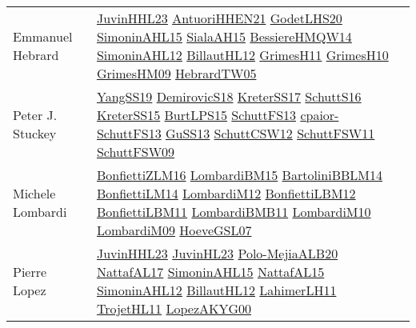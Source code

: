 {\begin{longtable}{p{4cm}p{20cm}}
Emmanuel Hebrard & \href{papers/JuvinHHL23.pdf}{JuvinHHL23}\cite{JuvinHHL23} \href{papers/AntuoriHHEN21.pdf}{AntuoriHHEN21}\cite{AntuoriHHEN21} \href{papers/GodetLHS20.pdf}{GodetLHS20}\cite{GodetLHS20} \href{articles/SimoninAHL15.pdf}{SimoninAHL15}\cite{SimoninAHL15} \href{papers/SialaAH15.pdf}{SialaAH15}\cite{SialaAH15} \href{papers/BessiereHMQW14.pdf}{BessiereHMQW14}\cite{BessiereHMQW14} \href{papers/SimoninAHL12.pdf}{SimoninAHL12}\cite{SimoninAHL12} \href{papers/BillautHL12.pdf}{BillautHL12}\cite{BillautHL12} \href{papers/GrimesH11.pdf}{GrimesH11}\cite{GrimesH11} \href{papers/GrimesH10.pdf}{GrimesH10}\cite{GrimesH10} \href{papers/GrimesHM09.pdf}{GrimesHM09}\cite{GrimesHM09} \href{papers/HebrardTW05.pdf}{HebrardTW05}\cite{HebrardTW05} \\
Peter J. Stuckey & \href{papers/YangSS19.pdf}{YangSS19}\cite{YangSS19} \href{papers/DemirovicS18.pdf}{DemirovicS18}\cite{DemirovicS18} \href{articles/KreterSS17.pdf}{KreterSS17}\cite{KreterSS17} \href{papers/SchuttS16.pdf}{SchuttS16}\cite{SchuttS16} \href{papers/KreterSS15.pdf}{KreterSS15}\cite{KreterSS15} \href{papers/BurtLPS15.pdf}{BurtLPS15}\cite{BurtLPS15} \href{papers/SchuttFS13.pdf}{SchuttFS13}\cite{SchuttFS13} \href{papers/cpaior-SchuttFS13.pdf}{cpaior-SchuttFS13}\cite{cpaior-SchuttFS13} \href{papers/GuSS13.pdf}{GuSS13}\cite{GuSS13} \href{papers/SchuttCSW12.pdf}{SchuttCSW12}\cite{SchuttCSW12} \href{articles/SchuttFSW11.pdf}{SchuttFSW11}\cite{SchuttFSW11} \href{papers/SchuttFSW09.pdf}{SchuttFSW09}\cite{SchuttFSW09} \\
Michele Lombardi & \href{papers/BonfiettiZLM16.pdf}{BonfiettiZLM16}\cite{BonfiettiZLM16} \href{papers/LombardiBM15.pdf}{LombardiBM15}\cite{LombardiBM15} \href{papers/BartoliniBBLM14.pdf}{BartoliniBBLM14}\cite{BartoliniBBLM14} \href{papers/BonfiettiLM14.pdf}{BonfiettiLM14}\cite{BonfiettiLM14} \href{articles/LombardiM12.pdf}{LombardiM12}\cite{LombardiM12} \href{papers/BonfiettiLBM12.pdf}{BonfiettiLBM12}\cite{BonfiettiLBM12} \href{papers/BonfiettiLBM11.pdf}{BonfiettiLBM11}\cite{BonfiettiLBM11} \href{papers/LombardiBMB11.pdf}{LombardiBMB11}\cite{LombardiBMB11} \href{papers/LombardiM10.pdf}{LombardiM10}\cite{LombardiM10} \href{papers/LombardiM09.pdf}{LombardiM09}\cite{LombardiM09} \href{papers/HoeveGSL07.pdf}{HoeveGSL07}\cite{HoeveGSL07} \\
Pierre Lopez & \href{papers/JuvinHHL23.pdf}{JuvinHHL23}\cite{JuvinHHL23} \href{papers/JuvinHL23.pdf}{JuvinHL23}\cite{JuvinHL23} \href{articles/Polo-MejiaALB20.pdf}{Polo-MejiaALB20}\cite{Polo-MejiaALB20} \href{articles/NattafAL17.pdf}{NattafAL17}\cite{NattafAL17} \href{articles/SimoninAHL15.pdf}{SimoninAHL15}\cite{SimoninAHL15} \href{articles/NattafAL15.pdf}{NattafAL15}\cite{NattafAL15} \href{papers/SimoninAHL12.pdf}{SimoninAHL12}\cite{SimoninAHL12} \href{papers/BillautHL12.pdf}{BillautHL12}\cite{BillautHL12} \href{papers/LahimerLH11.pdf}{LahimerLH11}\cite{LahimerLH11} \href{articles/TrojetHL11.pdf}{TrojetHL11}\cite{TrojetHL11} \href{articles/LopezAKYG00.pdf}{LopezAKYG00}\cite{LopezAKYG00} \\

\end{longtable}}
